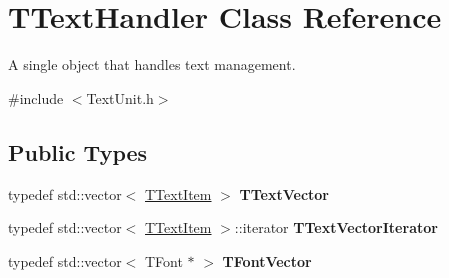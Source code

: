 \hypertarget{class_t_text_handler}{}\section{T\+Text\+Handler Class Reference}
\label{class_t_text_handler}


A single object that handles text management.  




{\ttfamily \#include $<$Text\+Unit.\+h$>$}

\subsection*{Public Types}
\begin{DoxyCompactItemize}
\item 
\mbox{\label{class_t_text_handler_a2538805e05af3522211884f3c2426e84}} 
typedef std\+::vector$<$ \mbox{\hyperlink{class_t_text_item}{T\+Text\+Item}} $>$ {\bfseries T\+Text\+Vector}
\item 
\mbox{\label{class_t_text_handler_a691b60d7ecb9bd6f8d8355467f3136e2}} 
typedef std\+::vector$<$ \mbox{\hyperlink{class_t_text_item}{T\+Text\+Item}} $>$\+::iterator {\bfseries T\+Text\+Vector\+Iterator}
\item 
\mbox{\label{class_t_text_handler_ae846ffb200b15db30bf486fe0c00922a}} 
typedef std\+::vector$<$ T\+Font $\ast$ $>$ {\bfseries T\+Font\+Vector}
\end{DoxyCompactItemize}
